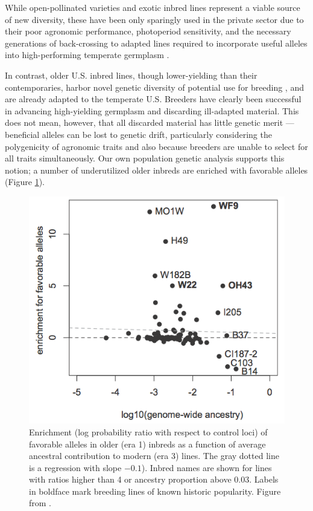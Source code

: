 \documentclass[12pt]{article}
\begin{document}
While open-pollinated varieties and exotic inbred lines represent a viable source of new diversity, these have been only sparingly used in the private sector due to their poor agronomic performance, photoperiod sensitivity, and the necessary generations of back-crossing to adapted lines required to incorporate useful alleles into high-performing temperate germplasm \citep{goodman1999broadening}.


In contrast, older U.S. inbred lines, though lower-yielding than their contemporaries, harbor novel genetic diversity of potential use for breeding \citep[e.g.][]{chen2012characterization,wisser2011multivariate}, and are already adapted to the temperate U.S.  
Breeders have clearly been successful in advancing high-yielding germplasm and discarding ill-adapted material.
This does not mean, however, that all discarded material has little genetic merit --- beneficial alleles can be lost to genetic drift, particularly considering the polygenicity of agronomic traits and also because breeders are unable to select for all traits simultaneously. Our own population genetic analysis supports this notion; a number of underutilized older inbreds are enriched with favorable alleles (Figure \ref{fig:wf9}).  

\begin{figure}
\includegraphics[width=0.55\linewidth]{joost_wf9.png}
\caption{Enrichment (log probability ratio with respect to control loci) of favorable alleles in older (era 1) inbreds as a function of average ancestral contribution to modern (era 3) lines. The gray dotted line is a  regression with slope $-0.1$). Inbred names are shown for lines with ratios higher than 4 or ancestry proportion above 0.03. Labels in boldface mark breeding lines of known historic popularity. Figure from \citet{van2012historical}.} 
\label{fig:wf9}
\end{figure}
\end{document}
